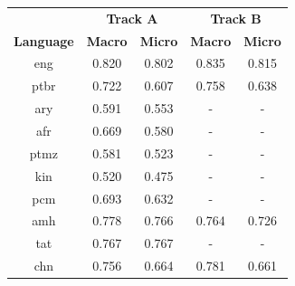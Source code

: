 \documentclass[11pt]{article}
\begin{document}
\begin{table}[]
\begin{tabular}{ccccc}
\hline
                                    & \multicolumn{2}{c}{\textbf{Track A}}                        & \multicolumn{2}{c}{\textbf{Track B}}                        \\
\multirow{-2}{*}{\textbf{Language}} & \textbf{Macro}               & \textbf{Micro}               & \textbf{Macro}               & \textbf{Micro}               \\ \hline
eng                                 & {\color[HTML]{212121} 0.820} & {\color[HTML]{212121} 0.802} & {\color[HTML]{212121} 0.835} & {\color[HTML]{212121} 0.815} \\
{\color[HTML]{212121} ptbr} & {\color[HTML]{212121} 0.722} & {\color[HTML]{212121} 0.607} & {\color[HTML]{212121} 0.758} & {\color[HTML]{212121} 0.638} \\
{\color[HTML]{212121} ary}          & {\color[HTML]{212121} 0.591} & {\color[HTML]{212121} 0.553} & {\color[HTML]{212121} -}     & {\color[HTML]{212121} -}     \\
{\color[HTML]{212121} afr}          & {\color[HTML]{212121} 0.669} & {\color[HTML]{212121} 0.580} & {\color[HTML]{212121} -}     & {\color[HTML]{212121} -}     \\
{\color[HTML]{212121} ptmz}         & {\color[HTML]{212121} 0.581} & {\color[HTML]{212121} 0.523} & {\color[HTML]{212121} -}     & {\color[HTML]{212121} -}     \\
{\color[HTML]{212121} kin}          & {\color[HTML]{212121} 0.520} & {\color[HTML]{212121} 0.475} & -                            & -                            \\
{\color[HTML]{212121} pcm}          & {\color[HTML]{212121} 0.693} & {\color[HTML]{212121} 0.632} & -                            & -                            \\
{\color[HTML]{212121} amh}          & {\color[HTML]{212121} 0.778} & {\color[HTML]{212121} 0.766} & {\color[HTML]{212121} 0.764} & {\color[HTML]{212121} 0.726} \\
{\color[HTML]{212121} tat}          & {\color[HTML]{212121} 0.767} & {\color[HTML]{212121} 0.767} & -                            & -                            \\
{\color[HTML]{212121} chn}          & {\color[HTML]{212121} 0.756} & {\color[HTML]{212121} 0.664} & {\color[HTML]{212121} 0.781} & {\color[HTML]{212121} 0.661} \\

\end{tabular}
\end{table}
\end{document}
